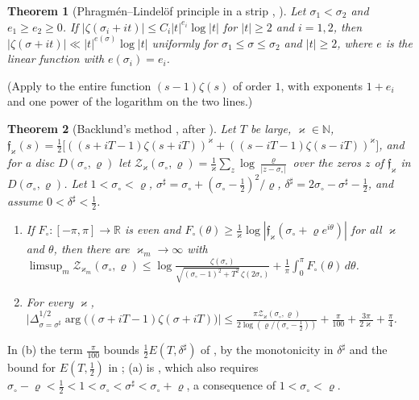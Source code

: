 \documentclass[preprint,12pt]{elsarticle}
\numberwithin{equation}{section}
\theoremstyle{plain}
\newtheorem{theorem}{Theorem}[section]
\theoremstyle{definition}
\theoremstyle{remark}
\newcommand{\R}{\mathbb R}
\begin{document}
\begin{theorem}[Phragm\'en--Lindel\"of principle in a strip {\cite[Lemma~2.5]{BellottiWong2025}}, {\cite[Lemma~3]{Trudgian2014}}]\label{thm:known_PL}
Let $\sigma_1<\sigma_2$ and $e_1\ge e_2\ge0$. If $|\zeta(\sigma_i+it)|\le C_i|t|^{e_i}\log|t|$ for $|t|\ge2$ and $i=1,2$, then $|\zeta(\sigma+it)|\ll|t|^{e(\sigma)}\log|t|$ uniformly for $\sigma_1\le\sigma\le\sigma_2$ and $|t|\ge2$, where $e$ is the linear function with $e(\sigma_i)=e_i$.
\end{theorem}
(Apply \cite[Lemma~2.5]{BellottiWong2025} to the entire function $(s-1)\zeta(s)$ of order $1$, with exponents $1+e_i$ and one power of the logarithm on the two lines.)

\begin{theorem}[Backlund's method {\cite[Lemmas~2.1, 2.3 and 2.4]{BellottiWong2025}}, after {\cite{Trudgian2014,HasanalizadeShenWong2022}}]\label{thm:known_backlund}
Let $T$ be large, $\varkappa\in\mathbb N$, $\mathfrak f_\varkappa(s)=\frac12\bigl[((s+iT-1)\zeta(s+iT))^\varkappa+((s-iT-1)\zeta(s-iT))^\varkappa\bigr]$, and for a disc $D(\sigma_\circ,\varrho)$ let $\mathcal Z_\varkappa(\sigma_\circ,\varrho)=\frac1\varkappa\sum_z\log\frac{\varrho}{|z-\sigma_\circ|}$ over the zeros $z$ of $\mathfrak f_\varkappa$ in $D(\sigma_\circ,\varrho)$. Let $1<\sigma_\circ<\varrho$, $\sigma^\sharp=\sigma_\circ+(\sigma_\circ-\frac12)^2/\varrho$, $\delta^\sharp=2\sigma_\circ-\sigma^\sharp-\frac12$, and assume $0<\delta^\sharp<\frac12$.
\begin{enumerate}[label=(\alph*),leftmargin=2em]
\item If $F_\circ:[-\pi,\pi]\to\R$ is even and $F_\circ(\theta)\ge\frac1\varkappa\log|\mathfrak f_\varkappa(\sigma_\circ+\varrho e^{i\theta})|$ for all $\varkappa$ and $\theta$, then there are $\varkappa_m\to\infty$ with $\limsup_m\mathcal Z_{\varkappa_m}(\sigma_\circ,\varrho)\le\log\frac{\zeta(\sigma_\circ)}{\sqrt{(\sigma_\circ-1)^2+T^2}\,\zeta(2\sigma_\circ)}+\frac1\pi\int_0^\pi F_\circ(\theta)\,d\theta$.
\item For every $\varkappa$, $\bigl|\Delta_{\sigma=\sigma^\sharp}^{1/2}\arg\bigl((\sigma+iT-1)\zeta(\sigma+iT)\bigr)\bigr|\le\frac{\pi\mathcal Z_\varkappa(\sigma_\circ,\varrho)}{2\log(\varrho/(\sigma_\circ-\frac12))}+\frac{\pi}{100}+\frac{3\pi}{2\varkappa}+\frac\pi4$.
\end{enumerate}
\end{theorem}
In (b) the term $\frac\pi{100}$ bounds $\frac12E(T,\delta^\sharp)$ of \cite[Lemma~2.3]{BellottiWong2025}, by the monotonicity in $\delta^\sharp$ and the bound for $E(T,\frac12)$ in \cite[Lemma~2.4]{BellottiWong2025}; (a) is \cite[Lemma~2.1]{BellottiWong2025}, which also requires $\sigma_\circ-\varrho<\frac12<1<\sigma_\circ<\sigma^\sharp<\sigma_\circ+\varrho$, a consequence of $1<\sigma_\circ<\varrho$.
\end{document}
